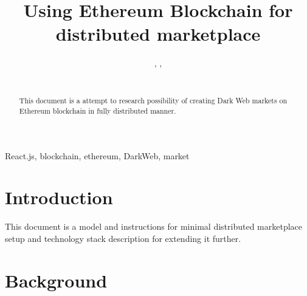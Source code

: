 \documentclass[journal]{IEEEtran} %
\begin{document}
\title{Using Ethereum Blockchain for distributed marketplace\\
}

\author{%
    , %
    , %
    \\%
    \\%
}

\maketitle

\begin{abstract}
    This document is a attempt to research possibility of creating Dark Web markets on Ethereum blockchain in fully distributed manner.
\end{abstract}

\begin{IEEEkeywords}
    React.js, blockchain, ethereum, DarkWeb, market
\end{IEEEkeywords}

\section{Introduction}
This document is a model and instructions for minimal distributed marketplace setup and technology stack description for extending it further.

\section{Background}
\end{document}
